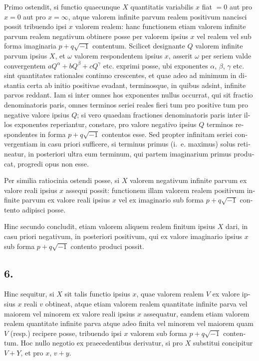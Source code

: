 \documentclass[12pt,a4paper]{article}
\begin{document}
\begin{otherlanguage}{latin}
Primo ostendit, si functio quaecunque $X$ quantitatis variabilis $x$ fiat $=0$ aut pro $x=0$ aut pro $x=\infty$, atque valorem infinite parvum realem positivum nancisci possit tribuendo ipsi $x$ valorem realem: hanc functionem etiam valorem infinite parvum realem negativum obtinere posse per valorem ipsius $x$ vel realem vel sub forma imaginaria $p+q\sqrt{-1}$ contentum. Scilicet designante $Q$ valorem infinite parvum ipsius $X$, et $\omega$ valorem respondentem ipsius $x$, asserit $\omega$ per seriem valde convergentem $aQ^{\alpha}+bQ^{\beta}+cQ^{\gamma}$ etc. exprimi posse, ubi exponentes $\alpha$, $\beta$, $\gamma$ etc. sint quantitates rationales continuo crescentes, et quae adeo ad minimum in distantia certa ab initio positivae evadant, terminosque, in quibus adsint, infinite parvos reddant. Iam si inter omnes hos exponentes nullus occurrat, qui sit fractio denominatoris paris, omnes terminos seriei reales fieri tum pro positive tum pro negative valore ipsius $Q$; si vero quaedam fractiones denominatoris paris inter illos exponentes reperiantur, constare, pro valore negativo ipsius $Q$ terminos respondentes in forma $p+q\sqrt{-1}$ contentos esse. Sed propter infinitam seriei convergentiam in casu priori sufficere, si terminus primus (i.~e. maximus) solus retineatur, in posteriori ultra eum terminum, qui partem imaginarium primus producat, progredi opus non esse.

Per similia ratiocinia ostendi posse, si $X$ valorem negativum infinite parvum ex valore reali ipsius $x$ assequi possit: functionem illam valorem realem positivum infinite parvum ex valore reali ipsius $x$ vel ex imaginario sub forma $p+q\sqrt{-1}$ contento adipisci posse.

Hinc secundo concludit, etiam valorem aliquem realem finitum ipsius $X$ dari, in casu priori negativum, in posteriori positivum, qui ex valore imaginario ipsius $x$ sub forma $p+q\sqrt{-1}$ contento produci possit.

\subsection*{6.}
Hinc sequitur, si $X$ sit talis functio ipsius $x$, quae valorem realem $V$ ex valore ipsius $x$ reali $v$ obtineat, atque etiam valorem realem quantitate infinite parva vel maiorem vel minorem ex valore reali ipsius $x$ assequatur, eandem etiam valorem realem quantitate infinite parva atque adeo finita vel minorem vel maiorem quam $V$ (resp.) recipere posse, tribuendo ipsi $x$ valorem sub forma $p+q\sqrt{-1}$ contentum. Hoc nullo negotio ex praecedentibus derivatur, si pro $X$ substitui concipitur $V+Y$, et pro $x$, $v+y$.


\end{otherlanguage}
\end{document}
